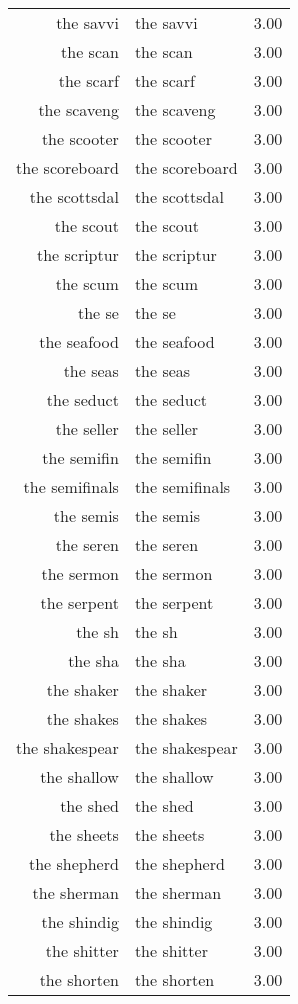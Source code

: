 \begin{table}[ht]
\begin{tabular}{rlr}
  the savvi & the savvi & 3.00 \\ 
  the scan & the scan & 3.00 \\ 
  the scarf & the scarf & 3.00 \\ 
  the scaveng & the scaveng & 3.00 \\ 
  the scooter & the scooter & 3.00 \\ 
  the scoreboard & the scoreboard & 3.00 \\ 
  the scottsdal & the scottsdal & 3.00 \\ 
  the scout & the scout & 3.00 \\ 
  the scriptur & the scriptur & 3.00 \\ 
  the scum & the scum & 3.00 \\ 
  the se & the se & 3.00 \\ 
  the seafood & the seafood & 3.00 \\ 
  the seas & the seas & 3.00 \\ 
  the seduct & the seduct & 3.00 \\ 
  the seller & the seller & 3.00 \\ 
  the semifin & the semifin & 3.00 \\ 
  the semifinals & the semifinals & 3.00 \\ 
  the semis & the semis & 3.00 \\ 
  the seren & the seren & 3.00 \\ 
  the sermon & the sermon & 3.00 \\ 
  the serpent & the serpent & 3.00 \\ 
  the sh & the sh & 3.00 \\ 
  the sha & the sha & 3.00 \\ 
  the shaker & the shaker & 3.00 \\ 
  the shakes & the shakes & 3.00 \\ 
  the shakespear & the shakespear & 3.00 \\ 
  the shallow & the shallow & 3.00 \\ 
  the shed & the shed & 3.00 \\ 
  the sheets & the sheets & 3.00 \\ 
  the shepherd & the shepherd & 3.00 \\ 
  the sherman & the sherman & 3.00 \\ 
  the shindig & the shindig & 3.00 \\ 
  the shitter & the shitter & 3.00 \\ 
  the shorten & the shorten & 3.00 \\ 

\end{tabular}
\end{table}

